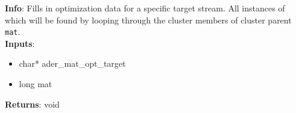 \textbf{Info}: Fills in optimization data for a specific target stream. All
instances of which will be found by looping through the cluster members of
cluster parent \texttt{mat}.\\

\noindent \textbf{Inputs}:
\begin{itemize}
\item{char* ader\_mat\_opt\_target}
\item{long mat}
\end{itemize}

\noindent \textbf{Returns}: void
